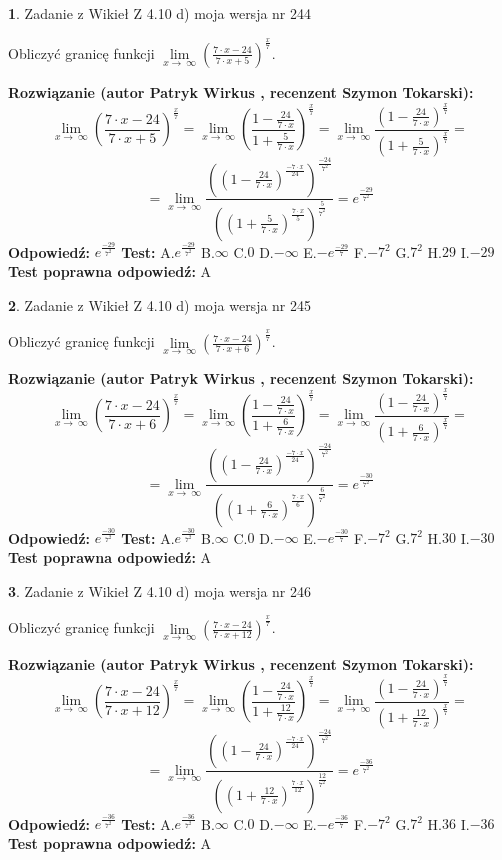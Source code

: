 \documentclass[12pt, a4paper]{article}
\theoremstyle{definition} %
\newtheorem{zad}{}
\newcommand{\zadStart}[1]{\begin{zad}#1\newline}
\newcommand{\zadStop}{\end{zad}}
\newcommand{\rozwStart}[2]{\noindent \textbf{Rozwiązanie (autor #1 , recenzent #2): }\newline}
\newcommand{\rozwStop}{\newline}
\newcommand{\odpStart}{\noindent \textbf{Odpowiedź:}\newline}
\newcommand{\odpStop}{\newline}
\newcommand{\testStart}{\noindent \textbf{Test:}\newline}
\newcommand{\testStop}{\newline}
\newcommand{\kluczStart}{\noindent \textbf{Test poprawna odpowiedź:}\newline}
\newcommand{\kluczStop}{\newline}
\begin{document}
\zadStart{Zadanie z Wikieł Z 4.10 d) moja wersja nr 244}


Obliczyć granicę funkcji  $\lim\limits_{x\to\ \infty}(\frac{7\cdot x-24}{7\cdot x+5})^{\frac{x}{7}}$.
\zadStop
\rozwStart{Patryk Wirkus}{Szymon Tokarski}
$$\lim\limits_{x\to\ \infty}(\frac{7\cdot x-24}{7\cdot x+5})^{\frac{x}{7}} = \lim\limits_{x\to\ \infty}(\frac{1-\frac{24}{7\cdot x}}{1+\frac{5}{7\cdot x}})^{\frac{x}{7}}=\lim\limits_{x\to\ \infty}\frac{(1-\frac{24}{7\cdot x})^{\frac{x}{7}}}{(1+\frac{5}{7\cdot x})^{\frac{x}{7}}}=$$
$$=\lim\limits_{x\to\ \infty}\frac{((1-\frac{24}{7\cdot x})^{\frac{-7\cdot x}{24}})^{\frac{-24}{7^{2}}}}{((1+\frac{5}{7\cdot x})^{\frac{7\cdot x}{5}})^{\frac{5}{7^{2}}}}=e^{\frac{-29}{7^{2}}}$$
\rozwStop
\odpStart
$e^{\frac{-29}{7^{2}}}$
\odpStop
\testStart
A.$e^{\frac{-29}{7^{2}}}$ B.$\infty$ C.$0$ D.$-\infty$ E.$-e^{\frac{-29}{7}}$
F.$-7^{2}$ G.$7^{2}$
H.$29$
I.$-29$
\testStop
\kluczStart
A
\kluczStop



\zadStart{Zadanie z Wikieł Z 4.10 d) moja wersja nr 245}


Obliczyć granicę funkcji  $\lim\limits_{x\to\ \infty}(\frac{7\cdot x-24}{7\cdot x+6})^{\frac{x}{7}}$.
\zadStop
\rozwStart{Patryk Wirkus}{Szymon Tokarski}
$$\lim\limits_{x\to\ \infty}(\frac{7\cdot x-24}{7\cdot x+6})^{\frac{x}{7}} = \lim\limits_{x\to\ \infty}(\frac{1-\frac{24}{7\cdot x}}{1+\frac{6}{7\cdot x}})^{\frac{x}{7}}=\lim\limits_{x\to\ \infty}\frac{(1-\frac{24}{7\cdot x})^{\frac{x}{7}}}{(1+\frac{6}{7\cdot x})^{\frac{x}{7}}}=$$
$$=\lim\limits_{x\to\ \infty}\frac{((1-\frac{24}{7\cdot x})^{\frac{-7\cdot x}{24}})^{\frac{-24}{7^{2}}}}{((1+\frac{6}{7\cdot x})^{\frac{7\cdot x}{6}})^{\frac{6}{7^{2}}}}=e^{\frac{-30}{7^{2}}}$$
\rozwStop
\odpStart
$e^{\frac{-30}{7^{2}}}$
\odpStop
\testStart
A.$e^{\frac{-30}{7^{2}}}$ B.$\infty$ C.$0$ D.$-\infty$ E.$-e^{\frac{-30}{7}}$
F.$-7^{2}$ G.$7^{2}$
H.$30$
I.$-30$
\testStop
\kluczStart
A
\kluczStop



\zadStart{Zadanie z Wikieł Z 4.10 d) moja wersja nr 246}


Obliczyć granicę funkcji  $\lim\limits_{x\to\ \infty}(\frac{7\cdot x-24}{7\cdot x+12})^{\frac{x}{7}}$.
\zadStop
\rozwStart{Patryk Wirkus}{Szymon Tokarski}
$$\lim\limits_{x\to\ \infty}(\frac{7\cdot x-24}{7\cdot x+12})^{\frac{x}{7}} = \lim\limits_{x\to\ \infty}(\frac{1-\frac{24}{7\cdot x}}{1+\frac{12}{7\cdot x}})^{\frac{x}{7}}=\lim\limits_{x\to\ \infty}\frac{(1-\frac{24}{7\cdot x})^{\frac{x}{7}}}{(1+\frac{12}{7\cdot x})^{\frac{x}{7}}}=$$
$$=\lim\limits_{x\to\ \infty}\frac{((1-\frac{24}{7\cdot x})^{\frac{-7\cdot x}{24}})^{\frac{-24}{7^{2}}}}{((1+\frac{12}{7\cdot x})^{\frac{7\cdot x}{12}})^{\frac{12}{7^{2}}}}=e^{\frac{-36}{7^{2}}}$$
\rozwStop
\odpStart
$e^{\frac{-36}{7^{2}}}$
\odpStop
\testStart
A.$e^{\frac{-36}{7^{2}}}$ B.$\infty$ C.$0$ D.$-\infty$ E.$-e^{\frac{-36}{7}}$
F.$-7^{2}$ G.$7^{2}$
H.$36$
I.$-36$
\testStop
\kluczStart
A
\kluczStop
\end{document}
